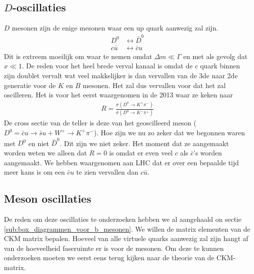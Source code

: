 \documentclass[../main.tex]{subfiles}
\begin{document}
\subsection{$D$-oscillaties}%
\label{sub:_d_oscillaties}

$D$ mesonen zijn de enige mesonen waar een up quark aanwezig zal zijn.
\begin{equation}
    \begin{aligned}
        \label{eq:d_mes_osc}
        D^{0} &\leftrightarrow \bar{D}^{0}\\
        c \bar{u} &\leftrightarrow \bar{c} u
    \end{aligned}
\end{equation}
Dit is extreem moeilijk om waar te nemen omdat $\Delta m \ll \Gamma$ en met als gevolg dat $x\ll 1$. De reden voor het heel brede verval kanaal is omdat de $c$ quark binnen zijn doublet vervalt wat veel makkelijker is dan vervallen van de 3de naar 2de generatie voor de $K$ en $B$ mesonen. Het zal dus vervallen voor dat het zal oscilleren. Het is voor het eerst waargenomen in de 2013 waar ze keken naar
\begin{equation}
    \begin{aligned}
        \label{eq:ratio_d_osc}
        R=\frac{\sigma\left(D^{0} \rightarrow K^{+} \pi^{-}\right)}{\sigma\left(D^{0} \rightarrow K^{-} \pi^{+}\right)}
    \end{aligned}
\end{equation}
De cross sectie van de teller is deze van het geoscilleerd meson ($D^0 = \bar{c}u \rightarrow \bar{s}u+W^+ \rightarrow K^+\pi^-$). Hoe zijn we nu zo zeker dat we begonnen waren met $D^0$ en niet $\bar{D}^0$. Dit zijn we niet zeker. Het moment dat ze aangemaakt worden weten we alleen dat $R=0$ is omdat er even veel $c$ als $\bar{c}$'s worden aangemaakt. We hebben waargenomen aan LHC dat er over een bepaalde tijd meer kans is om een $\bar{c}u$ te zien vervallen dan $c\bar{u}$.

\subsection{Meson oscillaties}%
\label{sub:meson_oscillaties}

De reden om deze oscillaties te onderzoeken hebben we al aangehaald on sectie \ref{sub:box_diagrammen_voor_b_mesonen}. We willen de matrix elementen van de CKM matrix bepalen. Hoeveel van alle virtuele quarks aanwezig zal zijn hangt af van de hoeveelheid faseruimte er is voor de mesonen. Om deze te kunnen onderzoeken moeten we eerst eens terug kijken naar de theorie van de CKM-matrix.
\end{document}
